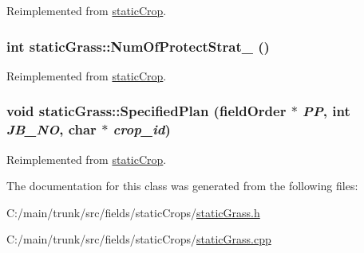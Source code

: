 Reimplemented from \hyperlink{classstatic_crop_a32b69ed138beaed150efa74d18e82d8e}{staticCrop}.\hypertarget{classstatic_grass_a83a8c218eab33bd04ab8599486beb5ae}{
\subsubsection[{NumOfProtectStrat\_\-}]{\setlength{\rightskip}{0pt plus 5cm}int staticGrass::NumOfProtectStrat\_\- ()}}
\label{classstatic_grass_a83a8c218eab33bd04ab8599486beb5ae}


Reimplemented from \hyperlink{classstatic_crop_a4d3d767f569f48eb68ffa76822302467}{staticCrop}.\hypertarget{classstatic_grass_a5a251ce2e9a3de9af455b09b3eb9efee}{
\subsubsection[{SpecifiedPlan}]{\setlength{\rightskip}{0pt plus 5cm}void staticGrass::SpecifiedPlan ({\bf fieldOrder} $\ast$ {\em PP}, \/  int {\em JB\_\-NO}, \/  char $\ast$ {\em crop\_\-id})}}
\label{classstatic_grass_a5a251ce2e9a3de9af455b09b3eb9efee}


Reimplemented from \hyperlink{classstatic_crop_af19d8a1e4f4833325f6712c22ede8b45}{staticCrop}.

The documentation for this class was generated from the following files:\begin{DoxyCompactItemize}
\item 
C:/main/trunk/src/fields/staticCrops/\hyperlink{static_grass_8h}{staticGrass.h}\item 
C:/main/trunk/src/fields/staticCrops/\hyperlink{static_grass_8cpp}{staticGrass.cpp}\end{DoxyCompactItemize}
